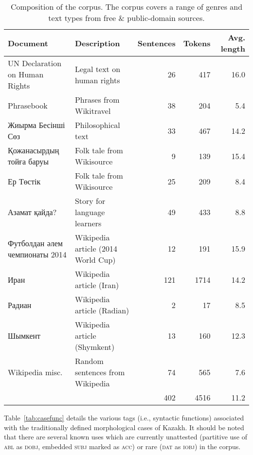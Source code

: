 \documentclass[a4paper,11pt, onecolumn,twoside]{article}
\newcommand{\gmk}[1]{{\rm {\ll \textsc{#1}}}}
\newcommand{\udtag}[1]{{\ll \textsc{#1}}}
\begin{document}
\begin{table}[htbp]
  \centering
  \caption{Composition of the corpus. The corpus covers a range of genres and text types from free \& public-domain sources.}
  \label{table:corpcomp}
	\begin{small}
		\begin{tabular}{llrrr}
			\toprule
				\textbf{Document} & \textbf{Description} & \textbf{Sentences} & \textbf{Tokens} & \textbf{Avg. length}\\
			\midrule
				UN Declaration on Human Rights & Legal text on human rights & 26 & 417 & 16.0 \\ %
				Phrasebook                     & Phrases from Wikitravel    & 38 & 204 & 5.4 \\ %
				Жиырма Бесінші Сөз             & Philosophical text         & 33 & 467 & 14.2 \\ %
				Қожанасырдың тойға баруы       & Folk tale from Wikisource  & 9 & 139 & 15.4 \\ %
				Ер Төстік                      & Folk tale from Wikisource  & 25 & 209 & 8.4 \\ %
				Азамат қайда?                  & Story for language learners & 49 & 433 & 8.8 \\ %
				Футболдан әлем чемпионаты 2014 & Wikipedia article (2014 World Cup) & 12 & 191 & 15.9 \\ %
				Иран & Wikipedia article (Iran)                             & 121 & 1714 & 14.2 \\ %
				Радиан & Wikipedia article (Radian)                         & 2 & 17 & 8.5 \\ %
				Шымкент & Wikipedia article (Shymkent)                      & 13 & 160 & 12.3 \\ %
				Wikipedia misc. & Random sentences from Wikipedia           & 74 & 565 & 7.6 \\ %
			\midrule
			\multicolumn{2}{c}{~} & 402 & 4516 & 11.2 \\\cmidrule[\heavyrulewidth]{3-5}
		\end{tabular}
	\end{small}
\end{table}

Table~\ref{tab:casefunc} details the various tags (i.e., syntactic functions) associated with the traditionally defined morphological cases of Kazakh.  It should be noted that there are several known uses which are currently unattested (partitive use of \gmk{abl} as \udtag{dobj}, embedded \udtag{subj} marked as \gmk{acc}) or rare (\gmk{dat} as \udtag{iobj}) in the corpus.
\end{document}
